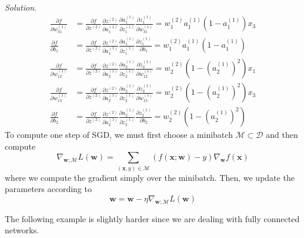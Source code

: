 \documentclass{article}
\theoremstyle{definition}
\theoremstyle{remark}
\theoremstyle{definition}
\newenvironment{solution}{\noindent \textit{Solution.}}{}
\begin{document}
\begin{solution}
\begin{align*}
          \frac{\partial f}{\partial w_{31}^{(1)}} & = \frac{\partial f}{\partial z^{(2)}} \frac{\partial z^{(2)}}{\partial a^{(1)}_1} \frac{\partial a^{(1)}_1}{\partial z_1^{(1)}} \frac{\partial z_1^{(1)}}{\partial w_{31}^{(1)}} = w_1^{(2)} a_1^{(1)} (1 - a_1^{(1)}) x_3\\
          \frac{\partial f}{\partial b_{1}} & = \frac{\partial f}{\partial z^{(2)}} \frac{\partial z^{(2)}}{\partial a^{(1)}_1} \frac{\partial a^{(1)}_1}{\partial z_1^{(1)}} \frac{\partial z_1^{(1)}}{\partial b_{1}}  = w_1^{(2)} a_1^{(1)} (1 - a_1^{(1)}) \\
          \frac{\partial f}{\partial w_{12}^{(1)}} & = \frac{\partial f}{\partial z^{(2)}} \frac{\partial z^{(2)}}{\partial a^{(1)}_2} \frac{\partial a^{(1)}_2}{\partial z_2^{(1)}} \frac{\partial z_2^{(1)}}{\partial w_{12}^{(1)}} = w_2^{(2)} (1 - (a_2^{(1)})^2 ) x_1\\
          \frac{\partial f}{\partial w_{13}^{(1)}} & = \frac{\partial f}{\partial z^{(2)}} \frac{\partial z^{(2)}}{\partial a^{(1)}_2} \frac{\partial a^{(1)}_2}{\partial z_2^{(1)}} \frac{\partial z_2^{(1)}}{\partial w_{13}^{(1)}} = w_2^{(2)} (1 - (a_2^{(1)})^2 ) x_3 \\
          \frac{\partial f}{\partial b_{2}} & = \frac{\partial f}{\partial z^{(2)}} \frac{\partial z^{(2)}}{\partial a^{(1)}_2} \frac{\partial a^{(1)}_2}{\partial z_2^{(1)}} \frac{\partial z_2^{(1)}}{\partial b_{2}} = w_2^{(2)} (1 - (a_2^{(1)})^2 )
      \end{align*}
      To compute one step of SGD, we must first choose a minibatch $\mathcal{M} \subset \mathcal{D}$ and then compute 
      \[\nabla_{\mathbf{w}; \mathcal{M}} L(\mathbf{w}) = \sum_{(\mathbf{x}, y) \in \mathcal{M}} (f(\mathbf{x}; \mathbf{w}) - y) \nabla_{\mathbf{w}} f(\mathbf{x})\] 
      where we compute the gradient simply over the minibatch. Then, we update the parameters according to 
      \[\mathbf{w} = \mathbf{w} - \eta \nabla_{\mathbf{w}; \mathcal{M}} L(\mathbf{w}) \]
    \end{solution}

    The following example is slightly harder since we are dealing with fully connected networks. 
\end{document}

